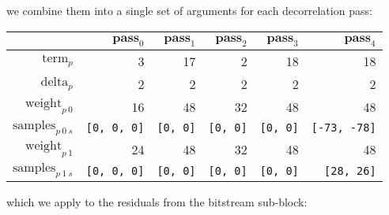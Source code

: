\par
\noindent
we combine them into a single set of arguments for each decorrelation pass:
\begin{table}[h]
{
  \begin{tabular}{|r|r|r|r|r|r|}
    \hline
    & $\textbf{pass}_0$ & $\textbf{pass}_1$ & $\textbf{pass}_2$ &
    $\textbf{pass}_3$ & $\textbf{pass}_4$ \\
    \hline
    $\text{term}_p$ & 3 & 17 & 2 & 18 & 18 \\
    $\text{delta}_p$ & 2 & 2 & 2 & 2 & 2 \\
    $\text{weight}_{p~0}$ & 16 & 48 & 32 & 48 & 48 \\
    $\text{samples}_{p~0~s}$ & \texttt{[0, 0, 0]} & \texttt{[0, 0]} &
    \texttt{[0, 0]} & \texttt{[0, 0]} & \texttt{[-73, -78]} \\
    $\text{weight}_{p~1}$ & 24 & 48 & 32 & 48 & 48 \\
    $\text{samples}_{p~1~s}$ & \texttt{[0, 0, 0]} & \texttt{[0, 0]} &
    \texttt{[0, 0]} & \texttt{[0, 0]} & \texttt{[28, 26]} \\
    \hline
  \end{tabular}
}
\end{table}
\par
\noindent
which we apply to the residuals from the bitstream sub-block:
\par
\noindent
